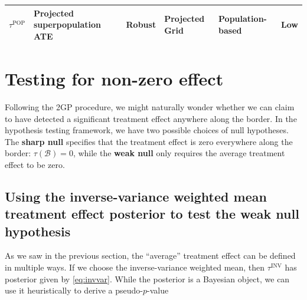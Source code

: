 \documentclass[letter]{article}
\newcommand{\border}{\mathcal{B}}
\newcommand{\invvar}{\tau^{\mathrm{INV}}}
\newcommand{\taupop}{\tau^{\mathrm{POP}}}
\begin{document}
\begin{longtable}[]{@{}llllll@{}}
\begin{minipage}[t]{0.09\columnwidth}
\(\taupop\)\strut
\end{minipage} & \begin{minipage}[t]{0.25\columnwidth}\raggedright\strut
Projected superpopulation ATE\strut
\end{minipage} & \begin{minipage}[t]{0.13\columnwidth}\raggedright\strut
Robust\strut
\end{minipage} & \begin{minipage}[t]{0.13\columnwidth}\raggedright\strut
Projected Grid\strut
\end{minipage} & \begin{minipage}[t]{0.15\columnwidth}\raggedright\strut
Population-based\strut
\end{minipage} & \begin{minipage}[t]{0.08\columnwidth}\raggedright\strut
Low\strut
\end{minipage}\tabularnewline
\bottomrule
\end{longtable}
    


    	\section{Testing for non-zero effect}\label{testing-for-non-zero-effect}
    

\label{sec:hypothesis_testing}
    	Following the 2GP procedure, we might naturally wonder whether we can claim to have detected a significant treatment effect anywhere along the border.
In the hypothesis testing framework, we have two possible choices of null hypotheses.
The \textbf{sharp null} specifies that the treatment effect is zero everywhere along the border:
\(\tau(\border)=0\),
while the \textbf{weak null} only requires the average treatment effect to be zero.

\subsection{Using the inverse-variance weighted mean treatment effect posterior to test the weak null hypothesis}\label{using-the-inverse-variance-weighted-mean-treatment-effect-posterior-to-test-the-weak-null-hypothesis}

As we saw in the previous section, the ``average'' treatment effect can be defined in multiple ways.
If we choose the inverse-variance weighted mean, then \(\invvar\) has posterior given by \eqref{eq:invvar}.
While the posterior is a Bayesian object, we can use it heuristically to derive a pseudo-\(p\)-value
\end{document}
